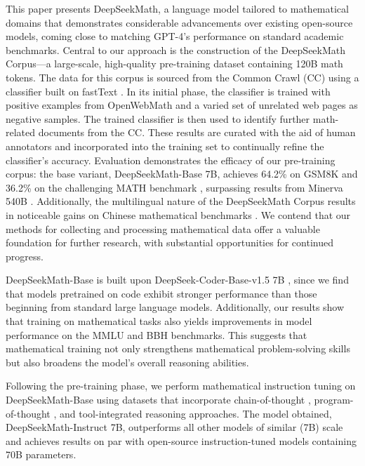 This paper presents DeepSeekMath, a language model tailored to mathematical domains that demonstrates considerable advancements over existing open-source models, coming close to matching GPT-4’s performance on standard academic benchmarks. Central to our approach is the construction of the DeepSeekMath Corpus—a large-scale, high-quality pre-training dataset containing 120B math tokens. The data for this corpus is sourced from the Common Crawl (CC) using a classifier built on fastText \citep{joulin2016fasttext}. In its initial phase, the classifier is trained with positive examples from OpenWebMath \citep{openwebmath} and a varied set of unrelated web pages as negative samples. The trained classifier is then used to identify further math-related documents from the CC. These results are curated with the aid of human annotators and incorporated into the training set to continually refine the classifier's accuracy. Evaluation demonstrates the efficacy of our pre-training corpus: the base variant, DeepSeekMath-Base 7B, achieves 64.2\% on GSM8K \citep{gsm8k} and 36.2\% on the challenging MATH benchmark \citep{MATH}, surpassing results from Minerva 540B \citep{minerva}. Additionally, the multilingual nature of the DeepSeekMath Corpus results in noticeable gains on Chinese mathematical benchmarks \citep{wei2023cmath,agieval}. We contend that our methods for collecting and processing mathematical data offer a valuable foundation for further research, with substantial opportunities for continued progress.

DeepSeekMath-Base is built upon DeepSeek-Coder-Base-v1.5 7B \citep{deepseek-coder}, since we find that models pretrained on code exhibit stronger performance than those beginning from standard large language models. Additionally, our results show that training on mathematical tasks also yields improvements in model performance on the MMLU \citep{mmlu} and BBH \citep{bbh} benchmarks. This suggests that mathematical training not only strengthens mathematical problem-solving skills but also broadens the model’s overall reasoning abilities.

Following the pre-training phase, we perform mathematical instruction tuning on DeepSeekMath-Base using datasets that incorporate chain-of-thought \citep{cot}, program-of-thought \citep{pot,pal}, and tool-integrated reasoning \citep{tora} approaches. The model obtained, DeepSeekMath-Instruct 7B, outperforms all other models of similar (7B) scale and achieves results on par with open-source instruction-tuned models containing 70B parameters.

